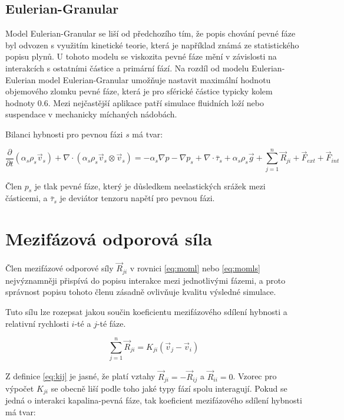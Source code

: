 \subsection{Eulerian-Granular}
Model Eulerian-Granular se liší od předchozího tím, že  popis chování pevné fáze byl odvozen s využitím kinetické teorie, která je například známá ze statistického popisu plynů. U tohoto modelu se viskozita pevné fáze mění v závislosti na interakcích s ostatními částice a primární fází. Na rozdíl od modelu Eulerian-Eulerian model Eulerian-Granular umožňuje nastavit maximální hodnotu objemového zlomku pevné fáze, která je pro sférické částice typicky kolem hodnoty \num{0.6}. Mezi nejčastější aplikace patří simulace fluidních loží nebo suspendace v mechanicky míchaných nádobách.

Bilanci hybnosti pro pevnou fázi $s$ má tvar:

\begin{equation}
	\frac{\partial}{\partial t} (\alpha_{s}\rho_{s}\vec{v}_{s}) + \nabla \cdot (\alpha_{s}\rho_{s} \vec{v}_{s} \otimes \vec{v}_{s}) = -\alpha_{s} \nabla p - \nabla p_{s} + \nabla \cdot \bar{\tau}_{s} + \alpha_{s}\rho_{s}\vec{g} + \sum_{j=1}^n \vec{R}_{ji} + \vec{F}_{ext} + \vec{F}_{int}
	\label{eq:momls}
\end{equation}
  
\noindent Člen $p_{s}$ je tlak pevné fáze, který je důsledkem neelastických srážek mezi částicemi, a $\bar{\tau}_{s}$ je deviátor tenzoru napětí pro pevnou fázi.       

\section{Mezifázová odporová síla}

Člen mezifázové odporové síly $\vec{R}_{ji}$ v rovnici \ref{eq:moml} nebo \ref{eq:momls} nejvýznamněji přispívá do popisu interakce mezi jednotlivými fázemi, a proto správnost popisu tohoto členu zásadně ovlivňuje kvalitu výsledné simulace. 

Tuto sílu lze rozepsat jakou součin koeficientu mezifázového sdílení hybnosti a relativní rychlosti $i$-té a $j$-té fáze.

\begin{equation}
	\sum_{j=1}^n \vec{R}_{ji} = K_{ji}(\vec{v}_{j} - \vec{v}_{i})
	\label{eq:kij}
\end{equation}

\noindent Z definice \ref{eq:kij} je jasné, že platí vztahy $\vec{R}_{ji} = -\vec{R}_{ij}$ a $\vec{R}_{ii} = 0$. Vzorec pro výpočet $K_{ji}$ se obecně liší podle toho jaké typy fází spolu interagují. Pokud se jedná o interakci kapalina-pevná fáze, tak koeficient mezifázového sdílení hybnosti má tvar:

